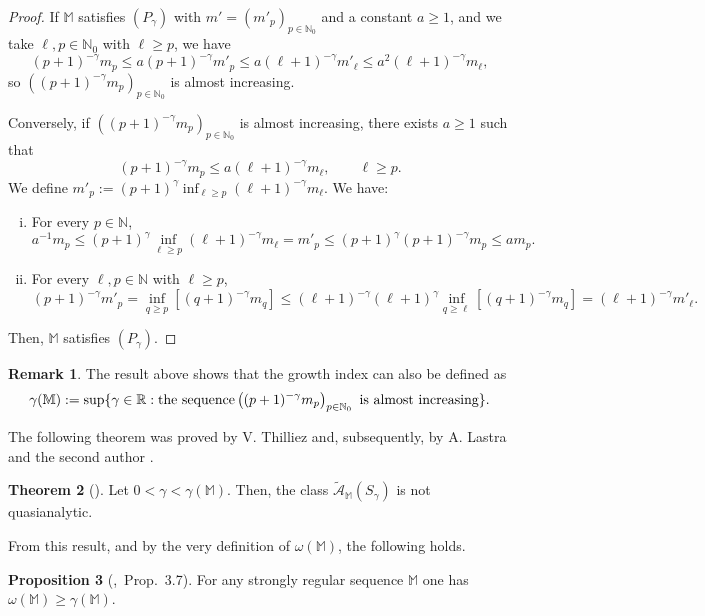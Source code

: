 \documentclass[11pt,a4paper]{article}
\theoremstyle{definition}
\newtheorem{theo}{Theorem}[section]
\newtheorem{pro}[theo]{Proposition}
\newtheorem{rema}[theo]{Remark}
\newenvironment{prop}{\smallskip\begin{pro}}{\end{pro}\smallskip}
\def\ga{\gamma}
\def\N{\mathbb{N}}
\def\R{\mathbb{R}}
\def\M{\mathbb{M}}
\def\bM{\mathbb{M}}%
\begin{document}
\begin{proof}
If $\M$ satisfies $\left(P_{\ga}\right)$ with $m'=(m'_{p})_{p\in\N_0}$ and a
constant $a\ge1$, and we take $\ell,p\in\N_0$ with $\ell\geq p$, we have
$$(p+1)^{-\ga}m_{p}\leq a (p+1)^{-\ga} m'_p \leq a (\ell+1)^{-\ga} m'_{\ell} \leq a^2 (\ell+1)^{-\ga} m_{\ell},$$
so $\left((p+1)^{-\ga}m_{p}\right)_{p\in\N_0}$ is almost increasing.\par
\noindent Conversely, if
 $\left((p+1)^{-\ga}m_{p}\right)_{p\in\N_0}$ is almost increasing, there exists $a\geq1$ such that
  $$(p+1)^{-\ga}m_{p} \leq a (\ell+1)^{-\ga}m_{\ell},\qquad \ell\geq p.  $$
 We define $m'_p:=(p+1)^{\ga} \inf_{\ell\geq p}  (\ell+1)^{-\ga} m_{\ell}$. We have:
 \begin{enumerate}[(i)]
  \item For every $p\in\N$,
  $$a^{-1}m_{p} \le (p+1)^{\ga} \inf_{\ell\geq p} (\ell+1)^{-\ga} m_{\ell}=  m'_p \le (p+1)^{\ga} (p+1)^{-\ga} m_p \le  a m_p.$$
  \item For every $\ell,p\in\N$ with  $\ell\geq p$,
  $$(p+1)^{-\ga}m'_{p}= \inf_{q\geq p}[ (q+1)^{-\ga} m_q] \le (\ell+1)^{-\ga} (\ell+1)^{\ga}  \inf_{q\geq \ell} [(q+1)^{-\ga} m_q ] =(\ell+1)^{-\ga}m'_{\ell}.$$
 \end{enumerate}
Then, $\M$ satisfies  $\left(P_{\ga}\right)$.
 \end{proof}

\begin{rema}\label{remaGammaMAlmostIncreasing}
The result above shows that the growth index can also be defined as
$$\ga(\bM):=\sup\{\ga\in\R: \hbox{the sequence} \left((p+1)^{-\ga}m_{p}\right)_{p\in\N_0} \hbox{ is almost increasing}\}.$$
\end{rema}

The following theorem was proved by V. Thilliez \cite{thilliez} and, subsequently, by A. Lastra and the second author \cite{lastrasanz1}.

\begin{theo}[\cite{thilliez}]
Let $0<\ga<\ga(\M)$.
Then, the class $\mathcal{\tilde{A}}_{\M}(S_{\gamma})$ is not quasianalytic.
\end{theo}

From this result, and by the very definition of $\omega(\M)$, the following holds.

\begin{prop}[\cite{SanzFlat},\ Prop.\ 3.7]\label{pro.gamma.menor.omega}
For any strongly regular sequence $\M$ one has $\omega(\M)\ge \gamma(\M)$.
\end{prop}
\end{document}
